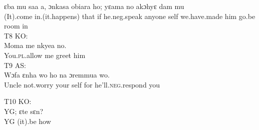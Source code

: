 \documentclass[output=paper,colorlinks,citecolor=brown]{langscibook}
\begin{document}
    \gll    ɛba mu saa a, ɔnkasa obiara ho; yɛama no akɔhyɛ dam mu \\
            (It).come in.(it.happens) that if he.neg.speak anyone self we.have.made him go.be room in \\
\ex T8 KO:\\\label{ex:obeng:37}
    \gll    Moma me nkyea no. \\
            You.\textsc{pl}.allow me greet him \\
\ex T9 AS:\\\label{ex:obeng:38}
    \gll    Wɔfa ɛnha wo ho na ɔremmua wo. \\
            Uncle not.worry your self for he’ll.\textsc{neg}.respond you \\

\ex T10 KO:\\\label{ex:obeng:39}
    \gll    YG; ɛte sɛn? \\
            YG (it).be how \\

\end{document}
